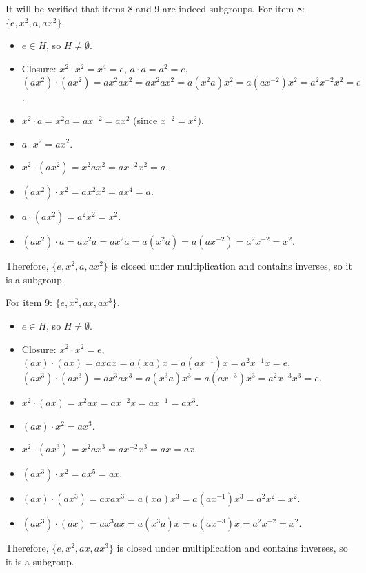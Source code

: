 \begin{enumerate}
\begin{enumerate}
\begin{subprove}
      It will be verified that items 8 and 9 are indeed subgroups.
      For item 8: \(\{e, x^{2}, a, a x^{2}\}\).
      \begin{itemize}
        \item \(e \in H\), so \(H \neq \emptyset\).
        \item Closure: \(x^{2} \cdot x^{2} = x^{4} = e\), \(a \cdot a = a^{2} = e\), \((a x^{2}) \cdot (a x^{2}) = a x^{2} a x^{2} = a x^{2} a x^{2} = a (x^{2} a) x^{2} = a (a x^{-2}) x^{2} = a^{2} x^{-2} x^{2} = e\).
        \item \(x^{2} \cdot a = x^{2} a = a x^{-2} = a x^{2}\) (since \(x^{-2} = x^{2}\)).
        \item \(a \cdot x^{2} = a x^{2}\).
        \item \(x^{2} \cdot (a x^{2}) = x^{2} a x^{2} = a x^{-2} x^{2} = a\).
        \item \((a x^{2}) \cdot x^{2} = a x^{2} x^{2} = a x^{4} = a\).
        \item \(a \cdot (a x^{2}) = a^{2} x^{2} = x^{2}\).
        \item \((a x^{2}) \cdot a = a x^{2} a = a x^{2} a = a (x^{2} a) = a (a x^{-2}) = a^{2} x^{-2} = x^{2}\).
      \end{itemize}
      Therefore, \(\{e, x^{2}, a, a x^{2}\}\) is closed under multiplication and contains inverses, so it is a subgroup.
      
      For item 9: \(\{e, x^{2}, a x, a x^{3}\}\).
      \begin{itemize}
        \item \(e \in H\), so \(H \neq \emptyset\).
        \item Closure: \(x^{2} \cdot x^{2} = e\), \((a x) \cdot (a x) = a x a x = a (x a) x = a (a x^{-1}) x = a^{2} x^{-1} x = e\), \((a x^{3}) \cdot (a x^{3}) = a x^{3} a x^{3} = a (x^{3} a) x^{3} = a (a x^{-3}) x^{3} = a^{2} x^{-3} x^{3} = e\).
        \item \(x^{2} \cdot (a x) = x^{2} a x = a x^{-2} x = a x^{-1} = a x^{3}\).
        \item \((a x) \cdot x^{2} = a x^{3}\).
        \item \(x^{2} \cdot (a x^{3}) = x^{2} a x^{3} = a x^{-2} x^{3} = a x = a x\).
        \item \((a x^{3}) \cdot x^{2} = a x^{5} = a x\).
        \item \((a x) \cdot (a x^{3}) = a x a x^{3} = a (x a) x^{3} = a (a x^{-1}) x^{3} = a^{2} x^{2} = x^{2}\).
        \item \((a x^{3}) \cdot (a x) = a x^{3} a x = a (x^{3} a) x = a (a x^{-3}) x = a^{2} x^{-2} = x^{2}\).
      \end{itemize}
      Therefore, \(\{e, x^{2}, a x, a x^{3}\}\) is closed under multiplication and contains inverses, so it is a subgroup.
      

\end{subprove}
\end{enumerate}
\end{enumerate}
